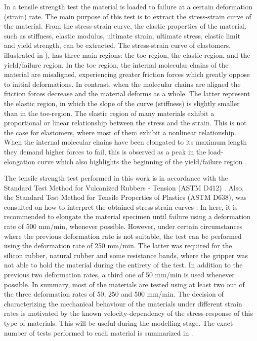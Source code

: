 In a tensile strength test the material is loaded to failure at a certain deformation (strain) rate. The main purpose of this test is to extract the stress-strain curve of the material. From the stress-strain curve, the elastic properties of the material, such as stiffness, elastic modulus, ultimate strain, ultimate stress, elastic limit and yield strength, can be extracted. The stress-strain curve of elastomers, illustrated in  ), has three main regions: the toe region, the elastic region, and the yield/failure region. In the toe region, the internal molecular chains of the material are misaligned, experiencing greater friction forces which greatly oppose to initial deformations. In contrast, when the molecular chains are aligned the friction forces decrease and the material deforms as a whole. The latter represent the elastic region, in which the slope of the curve (stiffness) is slightly smaller than in the toe-region. The elastic region of many materials exhibit a proportional or linear relationship between the stress and the strain. This is not the case for elastomers, where most of them exhibit a nonlinear relationship. When the internal molecular chains have been elongated to its maximum length they demand higher forces to fail, this is observed as a peak in the load-elongation curve which also highlights the beginning of the yield/failure region \cite{Bauman2008}.

The tensile strength test performed in this work is in accordance with the Standard Test Method for Vulcanized Rubbers - Tension (ASTM D412) \cite{astmd412}. Also, the Standard Test Method for Tensile Properties of Plastics (ASTM D638), was consulted on how to interpret the obtained stress-strain curves \cite{astmd638}. In here, it is recommended to elongate the material specimen until failure using a deformation rate of 500 mm/min, whenever possible. However, under certain circumstances where the previous deformation rate is not suitable, the test can be performed using the deformation rate of 250 mm/min. The latter was required for the silicon rubber, natural rubber and some resistance bands, where the gripper was not able to hold the material during the entirety of the test. In addition to the previous two deformation rates, a third one of 50 mm/min is used whenever possible. In summary, most of the materials are tested using at least two out of the three deformation rates of 50, 250 and 500 mm/min. The decision of characterizing the mechanical behaviour of the materials under different strain rates is motivated by the known velocity-dependency of the stress-response of this type of materials. This will be useful during the modelling stage. The exact number of tests performed to each material is summarized in .

